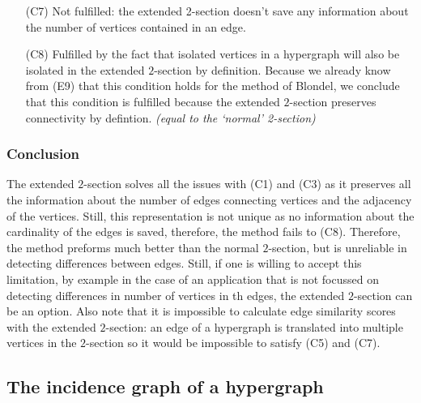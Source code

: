 \documentclass[a4paper,11pt]{report}
\begin{document}
\begin{itemize}
\begin{proof}
 \end{proof}
 Because the $2$-section preserves interchangeable vertices and we use the method of Blondel for which we already proved
 in (E6) that this condition holds, the result follows.
 \textit{(equal equal to the `normal' 2-section)}   
 
  \item[(C7)] Not fulfilled: the extended 2-section doesn't save any information 
  about the number of vertices contained in an edge.
    \item[(C8)] 
     Fulfilled by the fact that isolated vertices in a hypergraph will 
  also be isolated in the extended $2$-section by definition. Because we already know from (E9) that this condition
  holds for the method of Blondel, we conclude that 
  this condition is fulfilled because the extended $2$-section preserves connectivity by defintion. \textit{(equal to the `normal' 2-section)}
 \end{itemize}  
\subsubsection{Conclusion}
The extended $2$-section solves all the issues with (C1) and (C3) as it preserves all the information about the number of edges connecting
vertices 
and the adjacency of the vertices. Still, this representation is not unique as no information 
about the cardinality of the edges is saved, therefore, the method fails to (C8). Therefore, the method preforms 
much
better than the normal $2$-section, but is unreliable in detecting differences between edges. 
Still, if one is willing to accept this limitation, by example in the case of an application that 
is not focussed on detecting differences in number of vertices in th edges, the extended $2$-section can be an option.
Also note that it is impossible to calculate edge similarity scores with the extended $2$-section: 
an edge of a 
hypergraph is translated into multiple vertices in the $2$-section so it would 
be impossible to satisfy (C5) and (C7). 


\subsection{The incidence graph of a hypergraph}
\end{document}
